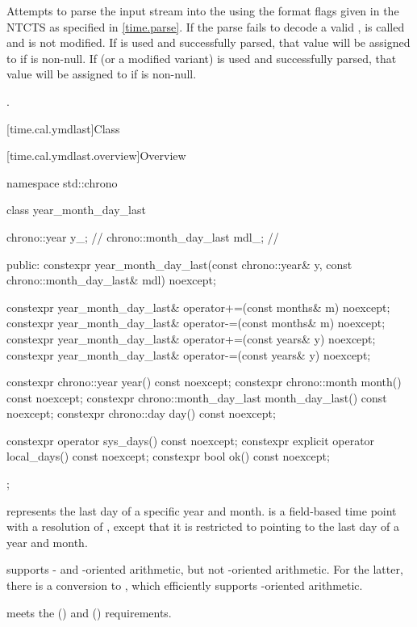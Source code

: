 \begin{itemdescr}
\pnum
\effects
Attempts to parse the input stream 
into the   using
the format flags given in the NTCTS 
as specified in \ref{time.parse}.
If the parse fails to decode a valid ,
 is called and
 is not modified.
If  is used and successfully parsed,
that value will be assigned to  if  is non-null.
If  (or a modified variant) is used and successfully parsed,
that value will be assigned to  if  is non-null.

\pnum
\returns
{}.
\end{itemdescr}

[time.cal.ymdlast]{Class }

[time.cal.ymdlast.overview]{Overview}

\begin{codeblock}
namespace std::chrono {
  class year_month_day_last {
    chrono::year           y_;          // \expos
    chrono::month_day_last mdl_;        // \expos

  public:
    constexpr year_month_day_last(const chrono::year& y,
                                  const chrono::month_day_last& mdl) noexcept;

    constexpr year_month_day_last& operator+=(const months& m) noexcept;
    constexpr year_month_day_last& operator-=(const months& m) noexcept;
    constexpr year_month_day_last& operator+=(const years& y)  noexcept;
    constexpr year_month_day_last& operator-=(const years& y)  noexcept;

    constexpr chrono::year           year()           const noexcept;
    constexpr chrono::month          month()          const noexcept;
    constexpr chrono::month_day_last month_day_last() const noexcept;
    constexpr chrono::day            day()            const noexcept;

    constexpr          operator sys_days()   const noexcept;
    constexpr explicit operator local_days() const noexcept;
    constexpr bool ok() const noexcept;
  };
}
\end{codeblock}

\pnum
{} represents the last day of a specific year and month.
 is a field-based time point with a resolution of ,
except that it is restricted to pointing to the last day of a year and month.
\begin{note}
 supports - and -oriented arithmetic,
but not -oriented arithmetic.
For the latter, there is a conversion to ,
which efficiently supports -oriented arithmetic.
\end{note}
 meets the  ()
and  () requirements.

